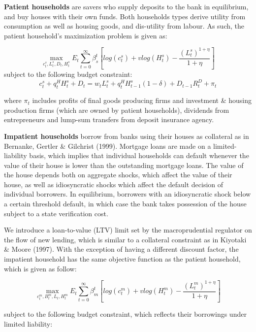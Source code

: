 \documentclass[12pt]{article}
\numberwithin{equation}{section}
\begin{document}
\noindent
\textbf{Patient households} are savers who supply deposits to the bank in equilibrium, and buy houses with their own funds. Both households types derive utility from consumption as well as housing goods, and dis-utility from labour. As such, the patient household's maximization problem is given as:

\begin{equation}
\max_{c^s_t,L^s_t,D_{t},H^s_t}E_t\sum _{t=0}^{\infty } \beta_{s}^t [log(c^s_t)+vlog(H^s_t)-\frac{(L^s_t)^{1+\eta}}{1+\eta} ]
\end{equation}
subject to the following budget constraint: 
\begin{equation}
c^s_t+q^H_{t}H^s_{t} +{D_{t}}=w_{t}L^s_{t}+q^H_{t}H^s_{t-1}(1-\delta)+{D_{t-1}}R^D_{t}+\pi_{t}
\end{equation}

where $\pi_{t}$ includes profits of final goods producing firms and investment \& housing production firms (which are owned by patient households), dividends from entrepreneurs and lump-sum transfers from deposit insurance agency. 



\noindent
\textbf{Impatient households} borrow from banks using their houses as collateral as in Bernanke, Gertler \& Gilchrist (1999). Mortgage loans are made on a limited-liability basis, which implies that individual households can default whenever the value of their house is lower than the outstanding mortgage loans. The value of the house depends both on aggregate shocks, which affect the value of their house, as well as idiosyncratic shocks which affect the default decision of individual borrowers. In equilibrium, borrowers with an idiosyncratic shock below a certain threshold default, in which case the bank takes possession of the house subject to a state verification cost.

We introduce a loan-to-value (LTV) limit set by the macroprudential regulator on the flow of new lending, which is similar to a collateral constraint as in Kiyotaki \& Moore (1997). With the exception of having a different discount factor, the impatient household has the same objective function as the patient household, which is given as follow: 

\begin{equation}
\max_{c^m_t,B^m_t,L_{t},H^m_t}E_t\sum _{t=0}^{\infty } \beta^t_{m} [log(c^m_t)+vlog(H^m_t)-\frac{(L^m_t)^{1+\eta}}{1+\eta} ]
\end{equation}

subject to the following budget constraint, which reflects their borrowings under limited liability: 
\end{document}
